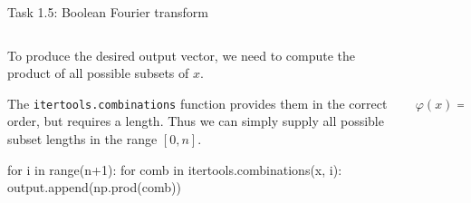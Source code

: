 \documentclass[aspectratio=169]{beamer}
\begin{document}
\begin{frame}[fragile]{Task 1.5: Boolean Fourier transform}
\begin{columns}
    \begin{column}{0.70\textwidth}
        To produce the desired output vector,
        we need to compute the product of all possible subsets of $x$.

        The \texttt{itertools.combinations} function provides them in the correct order, but requires a length.
        Thus we can simply supply all possible subset lengths in the range $[0, n]$.

        \begin{mylisting}
    for i in range(n+1):
        for comb in itertools.combinations(x, i):
            output.append(np.prod(comb))
        \end{mylisting}
    \end{column}
    \begin{column}{0.25\textwidth}
        \[ \varphi(x) =
        \begin{bmatrix}
        1 \\
        x_1 \\
        x_2 \\
        x_3 \\
        x_1 x_2 \\
        x_1 x_3 \\
        x_2 x_3 \\
        x_1 x_2 x_3 \\
        \end{bmatrix} \]
    \end{column}
\end{columns}
\end{frame}
\end{document}
